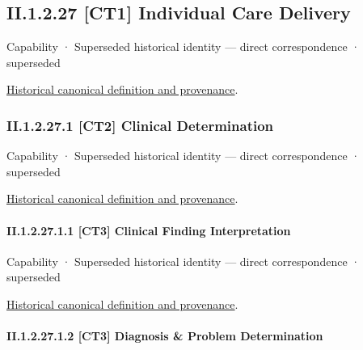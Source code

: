 \subsection*{II.1.2.27 [CT1] Individual Care Delivery}
\label{navigation:II.1.2.27}

\label{element:162deb7e292042f78f677a14476a3a1d}
{\small Capability · Superseded historical identity — direct correspondence · superseded}\par
\href{../../../../continuum/strategy/capability/162deb7e292042f78f677a14476a3a1d.md}{Historical canonical definition and provenance}.\par
\subsubsection*{II.1.2.27.1 [CT2] Clinical Determination}
\label{navigation:II.1.2.27.1}

\label{element:018ccd818ec142fba1ffb086d900acc6}
{\small Capability · Superseded historical identity — direct correspondence · superseded}\par
\href{../../../../continuum/strategy/capability/018ccd818ec142fba1ffb086d900acc6.md}{Historical canonical definition and provenance}.\par
\paragraph*{II.1.2.27.1.1 [CT3] Clinical Finding Interpretation}
\label{navigation:II.1.2.27.1.1}

\label{element:cf8ddfca7a8e4ed893ec39b795200d77}
{\small Capability · Superseded historical identity — direct correspondence · superseded}\par
\href{../../../../continuum/strategy/capability/cf8ddfca7a8e4ed893ec39b795200d77.md}{Historical canonical definition and provenance}.\par
\paragraph*{II.1.2.27.1.2 [CT3] Diagnosis \& Problem Determination}
\label{navigation:II.1.2.27.1.2}

